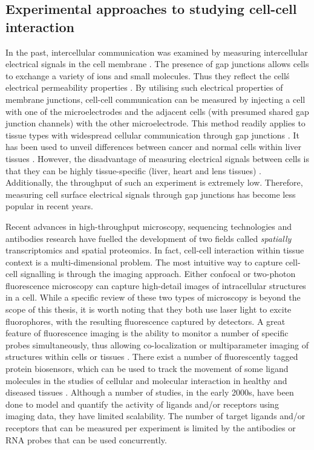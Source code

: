 \subsection{Experimental approaches to studying cell-cell interaction}
\label{Chap1:Sub_Spatial_Experiment_Platform}
In the past, intercellular communication was examined by measuring intercellular electrical signals in the cell membrane \cite{bennett1966physiology, loewenstein1967intercellular, de1982cell}. The presence of gap junctions allows cells to exchange a variety of ions and small molecules. Thus they reflect the cell\'s electrical permeability properties \cite{penn1966ionic, bennett1966physiology,loewenstein1966permeability,loewenstein1974cellular}. By utilising such electrical properties of membrane junctions, cell-cell communication can be measured by injecting a cell with one of the microelectrodes and the adjacent cells (with presumed shared gap junction channels) with the other microelectrode. This method readily applies to tissue types with widespread cellular communication through gap junctions \cite{penn1966ionic}. It has been used to unveil differences between cancer and normal cells within liver tissues \cite{loewenstein1966intercellular, loewenstein1967intercellular}. However, the disadvantage of measuring electrical signals between cells is that they can be highly tissue-specific (\ie liver, heart and lens tissues) \cite{gros1983comparative}. Additionally, the throughput of such an experiment is extremely low. Therefore, measuring cell surface electrical signals through gap junctions has become less popular in recent years. 

Recent advances in high-throughput microscopy, sequencing technologies and antibodies research have fuelled the development of two fields called \textit{spatially} transcriptomics and spatial proteomics. In fact, cell-cell interaction within tissue context is a multi-dimensional problem. The most intuitive way to capture cell-cell signalling is through the imaging approach. Either confocal or two-photon fluorescence microscopy can capture high-detail images of intracellular structures in a cell. While a specific review of these two types of microscopy is beyond the scope of this thesis, it is worth noting that they both use laser light to excite fluorophores, with the resulting fluorescence captured by detectors. A great feature of fluorescence imaging is the ability to monitor a number of specific probes simultaneously, thus allowing co-localization or multiparameter imaging of structures within cells or tissues \cite{periasamy2013methods}. There exist a number of fluorescently tagged protein biosensors, which can be used to track the movement of some ligand molecules in the studies of cellular and molecular interaction in healthy and diseased tissues \cite{gerdes2013cell}. Although a number of studies, in the early 2000s, have been done to model and quantify the activity of ligands and/or receptors \cite{awaji1998real, go1997quantitative, maamra1999studies, sneddon2003activation, bohme2009illuminating} using imaging data, they have limited scalability. The number of target ligands and/or receptors that can be measured per experiment is limited by the antibodies or RNA probes that can be used concurrently.    

